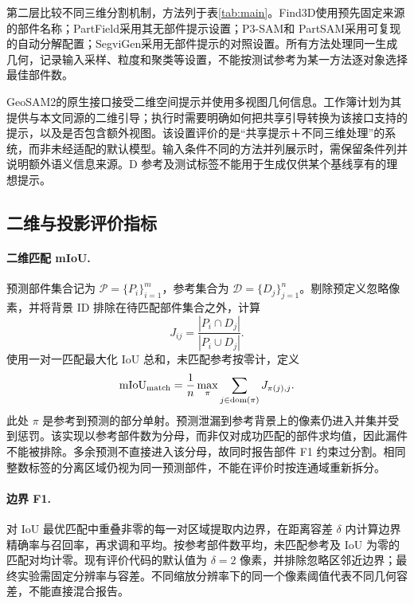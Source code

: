 第二层比较不同三维分割机制，方法列于表\ref{tab:main}。Find3D\citep{ma2024find3d}使用预先固定来源的部件名称；PartField\citep{liu2025partfield}采用其无部件提示设置；P3-SAM\citep{ma2025p3sam}和 PartSAM\citep{zhu2025partsam}采用可复现的自动分解配置；SegviGen\citep{li2026segvigen}采用无部件提示的对照设置。所有方法处理同一生成几何，记录输入采样、粒度和聚类等设置，不能按测试参考为某一方法逐对象选择最佳部件数。

GeoSAM2\citep{deng2025geosam2}的原生接口接受二维空间提示并使用多视图几何信息。工作簿计划为其提供与本文同源的二维引导；执行时需要明确如何把共享引导转换为该接口支持的提示，以及是否包含额外视图。该设置评价的是“共享提示＋不同三维处理”的系统，而非未经适配的默认模型。输入条件不同的方法并列展示时，需保留条件列并说明额外语义信息来源。D 参考及测试标签不能用于生成仅供某个基线享有的理想提示。



\subsection{二维与投影评价指标}
\paragraph{二维匹配 mIoU.}
预测部件集合记为 $\mathcal{P}=\{P_i\}_{i=1}^{m}$，参考集合为 $\mathcal{D}=\{D_j\}_{j=1}^{n}$。剔除预定义忽略像素，并将背景 ID 排除在待匹配部件集合之外，计算
\begin{equation}
 J_{ij}=\frac{|P_i\cap D_j|}{|P_i\cup D_j|}.
\end{equation}
使用一对一匹配最大化 IoU 总和，未匹配参考按零计，定义
\begin{equation}
 \mathrm{mIoU}_{\rm match}
 =\frac{1}{n}\max_{\pi}\sum_{j\in\operatorname{dom}(\pi)}J_{\pi(j),j}.
 \label{eq:miou}
\end{equation}
此处 $\pi$ 是参考到预测的部分单射。预测泄漏到参考背景上的像素仍进入并集并受到惩罚。该实现以参考部件数为分母，而非仅对成功匹配的部件求均值，因此漏件不能被排除。多余预测不直接进入该分母，故同时报告部件 F1 约束过分割。相同整数标签的分离区域仍视为同一预测部件，不能在评价时按连通域重新拆分。

\paragraph{边界 F1.}
对 IoU 最优匹配中重叠非零的每一对区域提取内边界，在距离容差 $\delta$ 内计算边界精确率与召回率，再求调和平均。按参考部件数平均，未匹配参考及 IoU 为零的匹配对均计零。现有评价代码的默认值为 $\delta=2$ 像素，并排除忽略区邻近边界；最终实验需固定分辨率与容差。不同缩放分辨率下的同一个像素阈值代表不同几何容差，不能直接混合报告。

